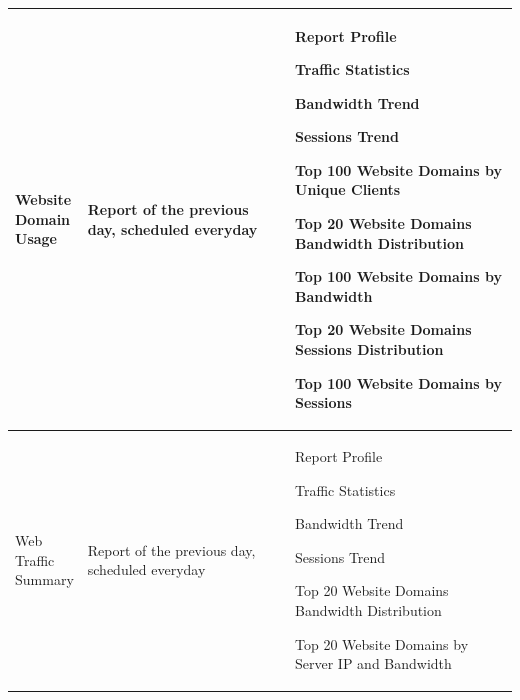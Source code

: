\begin{longtable}{p{}|p{}|p{}}
    \tabincell{l}{Website\\ Domain\\ Usage} &	Report of the previous day, scheduled everyday &	Report Profile


                                                                                                    Traffic Statistics


                                                                                                    Bandwidth Trend


                                                                                                    Sessions Trend 


                                                                                                    Top 100 Website Domains by Unique Clients


                                                                                                    Top 20 Website Domains Bandwidth Distribution


                                                                                                    Top 100 Website Domains by Bandwidth


                                                                                                    Top 20 Website Domains Sessions Distribution


                                                                                                    Top 100 Website Domains by Sessions \\\hline

    \tabincell{l}{Web\\ Traffic\\ Summary} &	Report of the previous day, scheduled everyday &	Report Profile


                                                                                                    Traffic Statistics


                                                                                                    Bandwidth Trend


                                                                                                    Sessions Trend 


                                                                                                    Top 20 Website Domains Bandwidth Distribution


                                                                                                    Top 20 Website Domains by Server IP and Bandwidth



\end{longtable}
